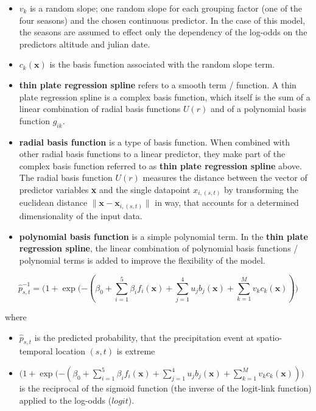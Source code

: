 \documentclass[
  12pt,
]{article}
\begin{document}
\begin{itemize}[label={}]
    \item $v_k$ is a random slope; one random slope for each grouping factor (one of the four seasons) and the chosen continuous predictor. In the case of this model, the seasons are assumed to effect only the dependency of the log-odds on the predictors altitude and julian date. 
    \item $c_k(\boldsymbol{x})$ is the basis function associated with the random slope term. 
    \item \textbf{thin plate regression spline} refers to a smooth term / function. A thin plate regression spline is a complex basis function, which itself is the sum of a linear combination of radial basis functions $U(r)$ and of a polynomial basis function $g_{ik}$.
    \item \textbf{radial basis function} is a type of basis function. When combined with other radial basis functions to a linear predictor, they make part of the complex basis function referred to as \textbf{thin plate regression spline} above. The radial basis function $U(r)$ measures the distance between the vector of predictor variables \textbf{x} and the single datapoint $x_{i,(s,t)}$ by transforming the euclidean distance $\lVert \boldsymbol{x} - \boldsymbol{x}_{i,(s,t)} \rVert$ in way, that accounts for a determined dimensionality of the input data. 
    \item \textbf{polynomial basis function} is a simple polynomial term. In the \textbf{thin plate regression spline}, the linear combination of polynomial basis functions / polynomial terms is added to improve the flexibility of the model. 
\end{itemize}

\begin{mdframed}[leftline = true, rightline = true, topline = false, bottomline = false, frametitle = {Predicted Probability}]
\begin{equation}\label{eq:predicted_probability_gamm}
\widehat{p}^{-1}_{s,t} = \Biggl(1 + \exp(-(\beta_0+\sum_{i = 1}^{5} \beta_i f_i(\boldsymbol{x}) + \sum_{j = 1}^{4} u_j b_j(\boldsymbol{x}) + \sum_{k = 1}^{M} v_k c_k(\boldsymbol{x}))\Biggr)
\end{equation}
\end{mdframed}

where

\begin{itemize}[label={}]
\item $\widehat{p}_{s,t}$ is the predicted probability, that the precipitation event at spatio-temporal location $(s,t)$ is extreme 
\item $\Biggl(1 + \exp(-(\beta_0+\sum_{i = 1}^{5} \beta_i f_i(\boldsymbol{x}) + \sum_{j = 1}^{4} u_j b_j(\boldsymbol{x}) + \sum_{k = 1}^{M} v_k c_k(\boldsymbol{x}))\Biggr)$ is the reciprocal of the sigmoid function (the inverse of the logit-link function) applied to the log-odds ($logit$).  
\end{itemize}
\end{document}
